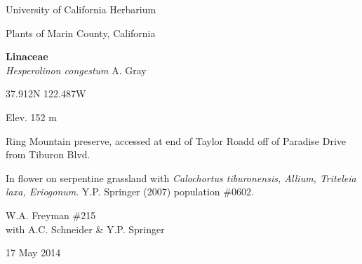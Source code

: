 \documentclass[letterpaper,10pt]{article}
\begin{document}
\begin{minipage}[t]{0.40\textwidth}

\begin{center}
University of California Herbarium \\
\begin{large}
Plants of Marin County, California \\
\end{large}
\vspace{\baselineskip}
\textbf{Linaceae} \\
\textit{Hesperolinon congestum} A. Gray\\
\end{center}

\begin{footnotesize}

\begin{multicols}{2}
37.912\textdegree N 122.487\textdegree W
\columnbreak
\begin{flushright}
Elev. 152 m
\end{flushright}
\end{multicols}

Ring Mountain preserve, accessed at end of Taylor Roadd off of Paradise Drive from Tiburon Blvd.
\vspace{\baselineskip}

In flower on serpentine grassland with \textit{Calochortus tiburonensis, Allium, Triteleia laxa, Eriogonum}. Y.P. Springer (2007) population \#0602.

\begin{multicols}{2}
W.A. Freyman \#215 \\
with A.C. Schneider \& Y.P. Springer
\columnbreak
\begin{flushright}
17 May 2014
\end{flushright}
\end{multicols}

\end{footnotesize}

\end{minipage}

\vspace{2cm}
%
%

%
%
\end{document}
